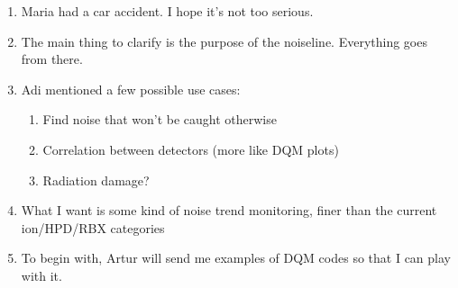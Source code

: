 

\begin{enumerate}
\item Maria had a car accident.  I hope it's not too serious.
\item The main thing to clarify is the purpose of the noiseline.  Everything goes from there.
\item Adi mentioned a few possible use cases:
   \begin{enumerate}
   \item Find noise that won't be caught otherwise
   \item Correlation between detectors (more like DQM plots)
   \item Radiation damage?
   \end{enumerate}
\item What I want is some kind of noise trend monitoring, finer than the current ion/HPD/RBX categories
\item To begin with, Artur will send me examples of DQM codes so that I can play with it.
\end{enumerate}


